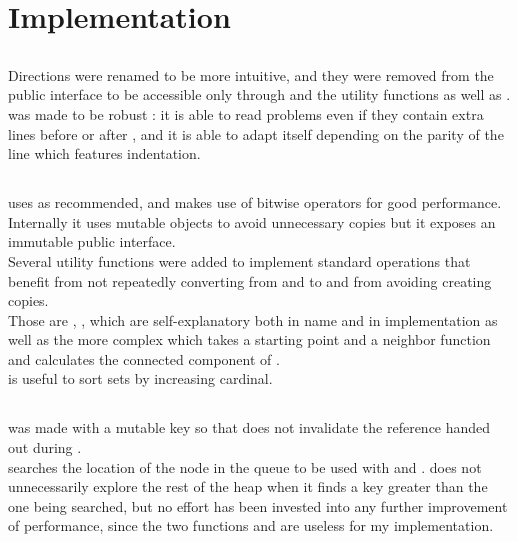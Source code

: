 \section{Implementation}


\subsection{}

Directions were renamed to be more intuitive, and they were removed
from the public interface to be accessible only through 
and the utility functions  as well as .\\

 was made to be robust : it is able to read problems even
if they contain extra lines before  or after ,
and it is able to adapt itself depending on the parity of the line which
features indentation.


\subsection{}

 uses  as recommended, and makes use of
bitwise operators for good performance.\\

Internally it uses mutable objects to avoid unnecessary copies but it exposes
an immutable public interface.\\

Several utility functions were added to implement standard operations that benefit
from not repeatedly converting from and to  and from avoiding creating
copies.\\
Those are , ,  which are self-explanatory
both in name and in implementation as well as the more complex
 which takes a starting point and a 
neighbor function and calculates the connected component of .\\
 is useful to sort sets by increasing cardinal.


\subsection{}

 was made with a mutable key so that  does
not invalidate the reference handed out during .\\
 searches the location of the node in the queue to be used with
 and .  does not unnecessarily explore
the rest of the heap when it finds a key greater than the one being searched,
but no effort has been invested into any further improvement of performance,
since the two functions  and  are useless for
my implementation.\\

